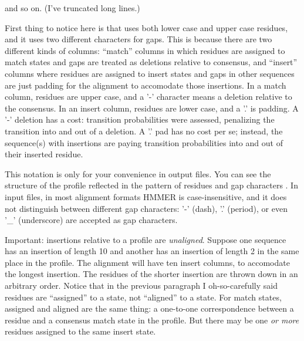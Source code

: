 and so on. (I've truncated long lines.)

First thing to notice here is that  uses both lower
case and upper case residues, and it uses two different characters for
gaps.  This is because there are two different kinds of columns:
``match'' columns in which residues are assigned to match states and
gaps are treated as deletions relative to consensus, and ``insert''
columns where residues are assigned to insert states and gaps in other
sequences are just padding for the alignment to accomodate those
insertions. In a match column, residues are upper case, and a '-'
character means a deletion relative to the consensus. In an insert
column, residues are lower case, and a '.' is padding.  A '-' deletion
has a cost: transition probabilities were assessed, penalizing the
transition into and out of a deletion. A '.' pad has no cost per se;
instead, the sequence(s) with insertions are paying transition
probabilities into and out of their inserted residue.

This notation is only for your convenience in output files. You can
see the structure of the profile reflected in the pattern of
residues and gap characters .  In input files, in
most alignment formats HMMER is
case-insensitive, and it does not distinguish between different gap
characters: '-' (dash), '.' (period), or even '\_' (underscore) are
accepted as gap characters.

Important: insertions relative to a profile are
\emph{unaligned}. Suppose one sequence has an insertion of length 10
and another has an insertion of length 2 in the same place in the
profile. The alignment will have ten insert columns, to accomodate the
longest insertion.  The residues of the shorter insertion are thrown
down in an arbitrary order.  Notice that in the previous paragraph I oh-so-carefully
said residues are ``assigned'' to a state, not ``aligned'' to a
state. For match states, assigned and aligned are the same thing: a
one-to-one correspondence between a residue and a consensus match
state in the profile. But there may be one \emph{or more} residues
assigned to the same insert state.

